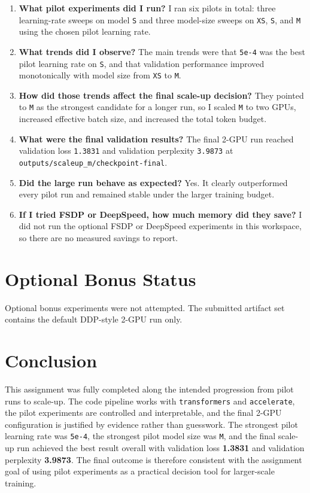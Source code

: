 \documentclass[11pt]{article}
\begin{document}
\begin{enumerate}
  \item \textbf{What pilot experiments did I run?} I ran six pilots in total: three learning-rate sweeps on model \texttt{S} and three model-size sweeps on \texttt{XS}, \texttt{S}, and \texttt{M} using the chosen pilot learning rate.
  \item \textbf{What trends did I observe?} The main trends were that \texttt{5e-4} was the best pilot learning rate on \texttt{S}, and that validation performance improved monotonically with model size from \texttt{XS} to \texttt{M}.
  \item \textbf{How did those trends affect the final scale-up decision?} They pointed to \texttt{M} as the strongest candidate for a longer run, so I scaled \texttt{M} to two GPUs, increased effective batch size, and increased the total token budget.
  \item \textbf{What were the final validation results?} The final 2-GPU run reached validation loss \texttt{1.3831} and validation perplexity \texttt{3.9873} at \texttt{outputs/scaleup\_m/checkpoint-final}.
  \item \textbf{Did the large run behave as expected?} Yes. It clearly outperformed every pilot run and remained stable under the larger training budget.
  \item \textbf{If I tried FSDP or DeepSpeed, how much memory did they save?} I did not run the optional FSDP or DeepSpeed experiments in this workspace, so there are no measured savings to report.
\end{enumerate}

\section{Optional Bonus Status}

Optional bonus experiments were not attempted. The submitted artifact set contains the default DDP-style 2-GPU run only.

\section{Conclusion}

This assignment was fully completed along the intended progression from pilot runs to scale-up. The code pipeline works with \texttt{transformers} and \texttt{accelerate}, the pilot experiments are controlled and interpretable, and the final 2-GPU configuration is justified by evidence rather than guesswork. The strongest pilot learning rate was \texttt{5e-4}, the strongest pilot model size was \texttt{M}, and the final scale-up run achieved the best result overall with validation loss \textbf{1.3831} and validation perplexity \textbf{3.9873}. The final outcome is therefore consistent with the assignment goal of using pilot experiments as a practical decision tool for larger-scale training.
\end{document}
